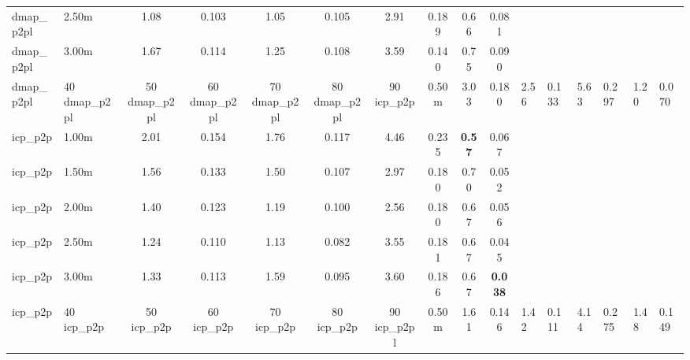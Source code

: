 \begin{tabular}{llcccccccc}
dmap\_p2pl & 2.50m & 1.08 & 0.103 & 1.05 & 0.105 & 2.91 & 0.189 & 0.66 & 0.081 \\
dmap\_p2pl & 3.00m & 1.67 & 0.114 & 1.25 & 0.108 & 3.59 & 0.140 & 0.75 & 0.090 \\
dmap\_p2pl & 40%
dmap\_p2pl & 50%
dmap\_p2pl & 60%
dmap\_p2pl & 70%
dmap\_p2pl & 80%
dmap\_p2pl & 90%
\midrule
icp\_p2p & 0.50m & 3.03 & 0.180 & 2.56 & 0.133 & 5.63 & 0.297 & 1.20 & 0.070 \\
icp\_p2p & 1.00m & 2.01 & 0.154 & 1.76 & 0.117 & 4.46 & 0.235 & \bfseries 0.57 & 0.067 \\
icp\_p2p & 1.50m & 1.56 & 0.133 & 1.50 & 0.107 & 2.97 & 0.180 & 0.70 & 0.052 \\
icp\_p2p & 2.00m & 1.40 & 0.123 & 1.19 & 0.100 & 2.56 & 0.180 & 0.67 & 0.056 \\
icp\_p2p & 2.50m & 1.24 & 0.110 & 1.13 & 0.082 & 3.55 & 0.181 & 0.67 & 0.045 \\
icp\_p2p & 3.00m & 1.33 & 0.113 & 1.59 & 0.095 & 3.60 & 0.186 & 0.67 & \bfseries 0.038 \\
icp\_p2p & 40%
icp\_p2p & 50%
icp\_p2p & 60%
icp\_p2p & 70%
icp\_p2p & 80%
icp\_p2p & 90%
\midrule
icp\_p2pl & 0.50m & 1.61 & 0.146 & 1.42 & 0.111 & 4.14 & 0.275 & 1.48 & 0.149 \\

\end{tabular}
